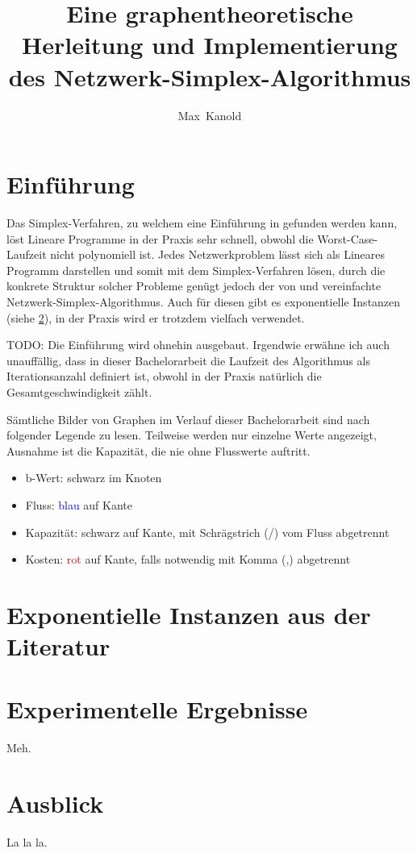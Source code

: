 \documentclass[11pt,a4paper,twoside,ngerman,openany]{scrbook}
\author{Max~Kanold}
\title{Eine graphentheoretische Herleitung und Implementierung des Netzwerk-Simplex-Algorithmus}
\theoremstyle{plain}
\theoremstyle{definition}
\begin{document}
\frontmatter
\maketitle
\cleardoublepage
\tableofcontents
\cleardoublepage

\mainmatter
\chapter{Einführung}
Das Simplex-Verfahren, zu welchem eine Einführung in \cite[Chvátal, 2002]{NSAbook} gefunden werden kann, löst Lineare Programme in der Praxis sehr schnell, obwohl die Worst-Case-Laufzeit nicht polynomiell ist. Jedes Netzwerkproblem lässt sich als Lineares Programm darstellen und somit mit dem Simplex-Verfahren lösen, durch die konkrete Struktur solcher Probleme genügt jedoch der von \cite[Dantzig, 1951]{erf1} und \cite[Orden, 1956]{erf2} vereinfachte Netzwerk-Simplex-Algorithmus. Auch für diesen gibt es exponentielle Instanzen (siehe \cref{ch:lit}), in der Praxis wird er trotzdem vielfach verwendet.

TODO: Die Einführung wird ohnehin ausgebaut. Irgendwie erwähne ich auch unauffällig, dass in dieser Bachelorarbeit die Laufzeit des Algorithmus als Iterationsanzahl definiert ist, obwohl in der Praxis natürlich die Gesamtgeschwindigkeit zählt.

Sämtliche Bilder von Graphen im Verlauf dieser Bachelorarbeit sind nach folgender Legende zu lesen. Teilweise werden nur einzelne Werte angezeigt, Ausnahme ist die Kapazität, die nie ohne Flusswerte auftritt.
\begin{itemize}\itemsep0em
    \item b-Wert: schwarz im Knoten
    \item Fluss: \textcolor{blue}{blau} auf Kante
    \item Kapazität: schwarz auf Kante, mit Schrägstrich (/) vom Fluss abgetrennt
    \item Kosten: \textcolor{red}{rot} auf Kante, falls notwendig mit Komma (,) abgetrennt
\end{itemize}



\chapter{Exponentielle Instanzen aus der Literatur}\label{ch:lit}

\chapter{Experimentelle Ergebnisse}\label{ch:erg}
Meh.

\chapter{Ausblick}
La la la.

\backmatter
{}

\end{document}
